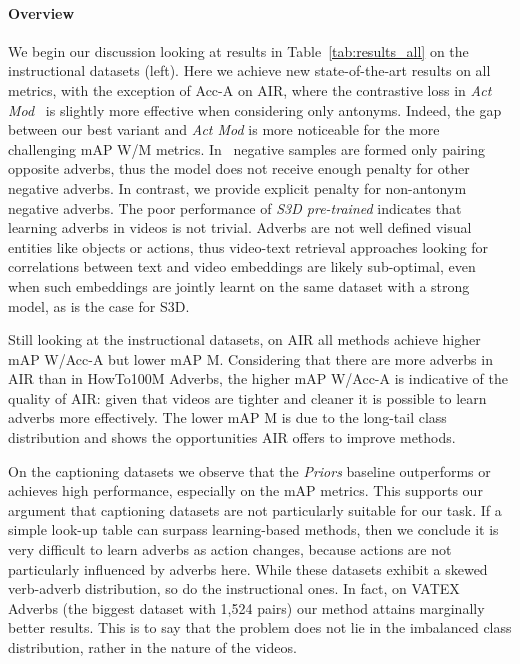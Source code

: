 \documentclass[10pt,twocolumn,letterpaper]{article}
\newcommand{\fparagraph}[1]{\paragraph{#1}}
\begin{document}
\fparagraph{Overview} We begin our discussion looking at results in Table~\ref{tab:results_all} on the instructional datasets (left).
Here we achieve new state-of-the-art results on all metrics,
with the exception of Acc-A on AIR, where the contrastive loss in \textit{Act Mod}~\cite{doughty2020action} is slightly more effective when considering only antonyms. Indeed, the gap between our best variant 
and \textit{Act Mod} is more noticeable for the more challenging mAP W/M metrics. 
In~\cite{doughty2020action} negative samples are formed only pairing opposite adverbs, thus the model does not receive enough penalty for other negative adverbs. In contrast, we 
provide 
explicit penalty for non-antonym negative adverbs. The poor performance of 
\textit{S3D pre-trained} 
indicates that learning adverbs in videos is not trivial. 
Adverbs are not well defined visual entities like objects or actions, thus video-text retrieval approaches looking for correlations between text and video embeddings are likely sub-optimal, even when such embeddings are jointly learnt on the same dataset with a strong model, as is the case for S3D. 

Still looking at the instructional datasets, on AIR all methods achieve higher mAP W/Acc-A but lower mAP M. Considering that there are more adverbs in AIR 
than in HowTo100M Adverbs, 
the higher mAP W/Acc-A is indicative of the quality of AIR: given that videos are tighter and cleaner it is possible to learn adverbs more effectively. 
The lower mAP M is due to the long-tail class distribution and  
shows the opportunities AIR offers to improve methods. 

On the captioning datasets we observe that the \textit{Priors} baseline outperforms or achieves high performance, especially on the mAP metrics. 
This supports our argument that captioning datasets are not particularly suitable for our task. 
If a simple look-up table can surpass learning-based methods, then we conclude it is very difficult to learn adverbs as action changes, 
because actions are not particularly influenced by adverbs here. While these datasets exhibit a skewed verb-adverb distribution, so do the instructional ones. In fact, on VATEX Adverbs (the biggest dataset with 1,524 pairs) our method attains marginally better results. This is to say that the problem does not lie in the imbalanced class distribution, rather in the 
nature of the videos. 
\end{document}
